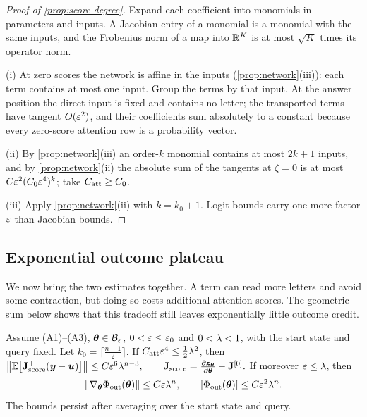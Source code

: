 \begin{proof}[Proof of \cref{prop:score-degree}]
Expand each coefficient into monomials in parameters and inputs. A Jacobian entry of a monomial is a monomial with the same inputs, and the
Frobenius norm of a map into $\mathbb R^K$ is at most $\sqrt K$ times its operator norm.

\noindent(i) At zero scores the network is affine in the inputs (\cref{prop:network}(iii)): each term contains at most one input. Group the terms by
that input. At the answer position the direct input is fixed and contains no letter; the transported terms have tangent $O(\varepsilon^2)$, and
their coefficients sum absolutely to a constant because every zero-score attention row is a probability vector.

\noindent(ii) By \cref{prop:network}(iii) an order-$k$ monomial contains at most $2k+1$ inputs, and by \cref{prop:network}(ii) the absolute sum of the
tangents at $\zeta=0$ is at most $C\varepsilon^2(C_0\varepsilon^4)^k$; take $C_{\mathrm{att}}\ge C_0$.

\noindent(iii) Apply \cref{prop:network}(ii) with $k=k_0+1$. Logit bounds carry one more factor $\varepsilon$ than Jacobian bounds.
\end{proof}

\subsection{Exponential outcome plateau}
\label{app:thm1}

We now bring the two estimates together. A term can read more letters and avoid some contraction, but doing so costs additional
attention scores. The geometric sum below shows that this tradeoff still leaves exponentially little outcome credit.

\begin{lemma}
\label{lem:score-sum}
Assume (A1)--(A3), $\bm\theta\in\mathcal B_{\varepsilon}$, $0<\varepsilon\le\varepsilon_0$ and $0<\lambda<1$, with the start state and query fixed. Let
$k_0=\lceil\frac{n-1}{2}\rceil$. If $C_{\mathrm{att}}\varepsilon^4\le\frac{1}{2}\lambda^2$, then
 $\bigl\|\E\bigl[\mathbf J_{\mathrm{score}}^\top(\bm y-\bm u)\bigr]\bigr\|\le C\initscale^6\mixrate^{n-3},\qquad \mathbf J_{\mathrm{score}}=\Jz-\mathbf J^{[0]}.$ 
If moreover $\varepsilon\le\lambda$, then
\begin{equation}
 \|\nabla_{\bm\theta}\Phi_{\mathrm{out}}(\bm\theta)\|\le C\varepsilon\lambda^n,\qquad |\Phi_{\mathrm{out}}(\bm\theta)|\le C\varepsilon^2\lambda^n.
 \label{eq:thm1-full}
\end{equation}
The bounds persist after averaging over the start state and query.
\end{lemma}

